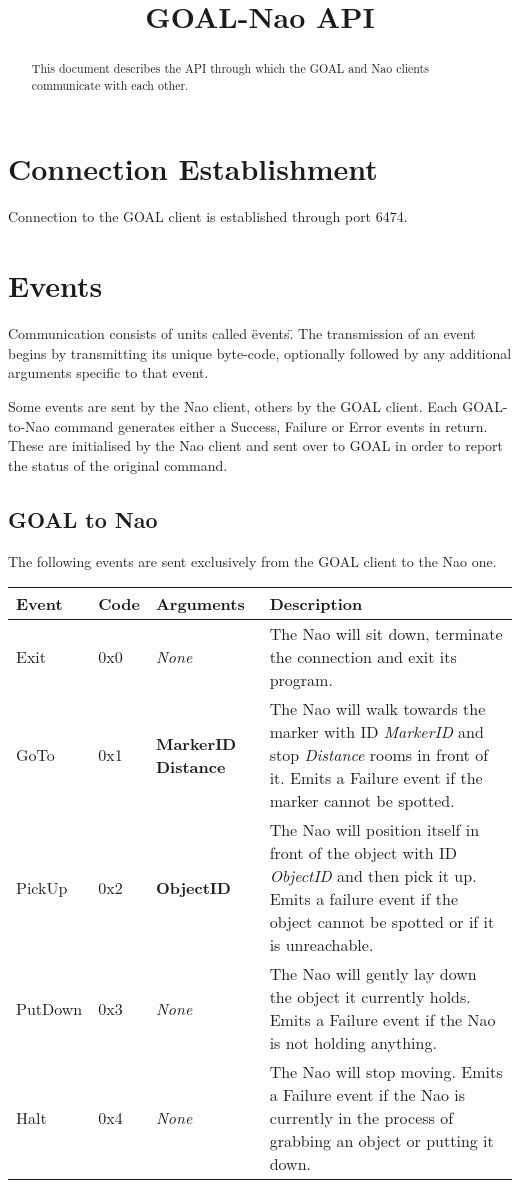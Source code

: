 \documentclass[12pt]{report}
\title{GOAL-Nao API}
\author{}
\begin{document}
\maketitle

\begin{abstract}
This document describes the API through which the GOAL and Nao clients communicate with each other.
\end{abstract}

\section{Connection Establishment}
Connection to the GOAL client is established through port 6474.

\section{Events}
Communication consists of units called \"events\". The transmission of an event begins by transmitting its unique byte-code, optionally followed by any additional arguments specific to that event.

Some events are sent by the Nao client, others by the GOAL client. Each GOAL-to-Nao command generates either a Success, Failure or Error events in return. These are initialised by the Nao client and sent over to GOAL in order to report the status of the original command.

\subsection{GOAL to Nao}
The following events are sent exclusively from the GOAL client to the Nao one. \\
\begin{tabular}{ | l | l | p{2.2cm} | p{8cm} | }
\hline
\textbf{Event} & \textbf{Code} & \textbf{Arguments} & \textbf{Description} \\ \hline
Exit & 0x0 & \textit{None} & The Nao will sit down, terminate the connection and exit its program. \\ \hline
GoTo & 0x1 & \textbf{MarkerID} \newline \textbf{Distance} & The Nao will walk towards the marker with ID \textit{MarkerID} and stop \textit{Distance} rooms in front of it. Emits a Failure event if the marker cannot be spotted. \\ \hline
PickUp & 0x2 & \textbf{ObjectID} & The Nao will position itself in front of the object with ID \textit{ObjectID} and then pick it up. Emits a failure event if the object cannot be spotted or if it is unreachable. \\ \hline
PutDown & 0x3 & \textit{None} & The Nao will gently lay down the object it currently holds. Emits a Failure event if the Nao is not holding anything. \\ \hline
Halt & 0x4 & \textit{None} & The Nao will stop moving. Emits a Failure event if the Nao is currently in the process of grabbing an object or putting it down. \\ \hline
\end{tabular}
\end{document}
